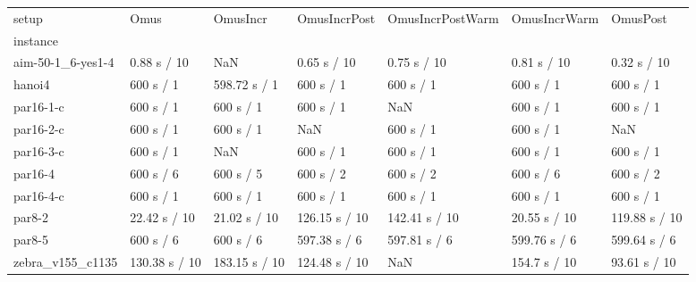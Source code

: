 
\begin{table*}[h!]
    \begin{tabular}{lllllll}
        setup &           Omus &       OmusIncr &   OmusIncrPost & OmusIncrPostWarm &  OmusIncrWarm &       OmusPost \\
        instance          &                &                &                &                  &               &                \\
        aim-50-1\_6-yes1-4 &    0.88 s / 10 &            NaN &    0.65 s / 10 &      0.75 s / 10 &   0.81 s / 10 &    0.32 s / 10 \\
        hanoi4            &      600 s / 1 &   598.72 s / 1 &      600 s / 1 &        600 s / 1 &     600 s / 1 &      600 s / 1 \\
        par16-1-c         &      600 s / 1 &      600 s / 1 &      600 s / 1 &              NaN &     600 s / 1 &      600 s / 1 \\
        par16-2-c         &      600 s / 1 &      600 s / 1 &            NaN &        600 s / 1 &     600 s / 1 &            NaN \\
        par16-3-c         &      600 s / 1 &            NaN &      600 s / 1 &        600 s / 1 &     600 s / 1 &      600 s / 1 \\
        par16-4           &      600 s / 6 &      600 s / 5 &      600 s / 2 &        600 s / 2 &     600 s / 6 &      600 s / 2 \\
        par16-4-c         &      600 s / 1 &      600 s / 1 &      600 s / 1 &        600 s / 1 &     600 s / 1 &      600 s / 1 \\
        par8-2            &   22.42 s / 10 &   21.02 s / 10 &  126.15 s / 10 &    142.41 s / 10 &  20.55 s / 10 &  119.88 s / 10 \\
        par8-5            &      600 s / 6 &      600 s / 6 &   597.38 s / 6 &     597.81 s / 6 &  599.76 s / 6 &   599.64 s / 6 \\
        zebra\_v155\_c1135  &  130.38 s / 10 &  183.15 s / 10 &  124.48 s / 10 &              NaN &  154.7 s / 10 &   93.61 s / 10 \\
        \end{tabular}
\end{table*}